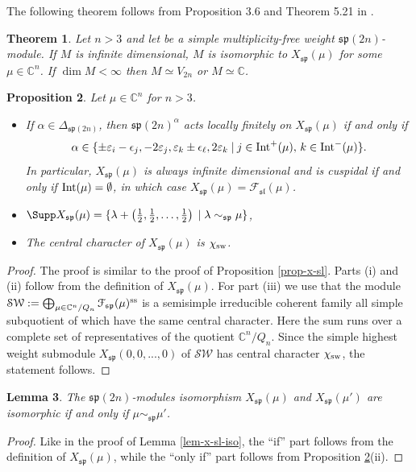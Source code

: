 \documentclass[12pt]{amsart}
\newcommand{\C}{{\mathbb C}}
\newtheorem{thm}{Theorem}[section]
\newtheorem{lem}[thm]{Lemma}
\newtheorem{prop}[thm]{Proposition}
\begin{document}
The following theorem follows from Proposition 3.6 and Theorem 5.21 in \cite{BBL}.
\begin{thm} \label{thm-x-sp-fin}Let $n>3$ and let  be  a simple multiplicity-free  weight $\mathfrak{sp}({2n})$-module. If $M$ is infinite dimensional, $M$  is isomorphic  to $X_{\mathfrak{sp}}(\mu)$ for some $\mu \in \C^{n}$. If $\dim M < \infty$ then  $M \simeq V_{2n}$ or $M \simeq \mathbb C$.
\end{thm}

\begin{prop} \label{thm-bounded-finite-sp}
Let $\mu \in \C^{n}$ for  $n>3$.
\begin{itemize} 
\item[(i)] If $\alpha \in \Delta_{\mathfrak{sp} (2n)}$, then $\mathfrak{sp}(2n)^{\alpha}$ acts locally finitely on $X_{\mathfrak{sp}}(\mu)$ if and only if 
$$\alpha \in \{\pm \varepsilon_i - \epsilon_j, - 2 \varepsilon_j,  \varepsilon_k \pm  \epsilon_\ell, 2 \varepsilon_k  \; | \: j  \in  {\rm Int}^+ (\mu), \, k  \in  {\rm Int}^- (\mu)\}.
$$
In particular, $X_{\mathfrak{sp}}(\mu)$ is always infinite dimensional and is cuspidal if and only if $ {\rm Int} (\mu) = \emptyset$,  in which case $X_{\mathfrak{sp}}(\mu) = {\mathcal F}_{\mathfrak{sl}} (\mu)$.
\item[(ii)] $\Supp X_{\mathfrak{sp}}(\mu) = \{ \lambda + \left(\frac{1}{2}, \frac{1}{2},\dots, \frac{1}{2}\right) \; | \; \lambda\sim_{\mathfrak{sp}} \mu \} $,
\item[(iii)] The central character of $X_{\mathfrak{sp}}(\mu) $ is $\chi_{\rm sw}$.
\end{itemize}
\end{prop}
\begin{proof} The proof is similar to the proof of Proposition \ref{prop-x-sl}. Parts (i) and  (ii) follow from the definition of $X_{\mathfrak{sp}}(\mu)$. For part (iii) we use that the module $\mathcal{SW}  := \bigoplus_{\mu \in \C^n/Q_n}{\mathcal F}_{\mathfrak{sp}} (\mu)^{\rm ss}$ is a semisimple irreducible coherent family all simple subquotient of which have the same central character. Here the sum runs over a complete set of representatives of the quotient $ \C^n/Q_n$. Since the simple highest weight submodule $X_{\mathfrak{sp}}(0, 0,...,0)$ of $\mathcal{SW}$ has central character  $\chi_{\rm sw}$, the statement follows. \end{proof}

\begin{lem}
The $\mathfrak{sp}({2n})$-modules isomorphism $X_{\mathfrak{sp}}(\mu)$ and $ X_{\mathfrak{sp}}(\mu')$ are isomorphic if and only if $\mu \sim_{\mathfrak{sp}} \mu'$.
\end{lem}
\begin{proof} Like in the proof of Lemma \ref{lem-x-sl-iso}, the ``if'' part follows from the definition of $X_{\mathfrak{sp}}(\mu)$, while the ``only if'' part follows from Proposition \ref{thm-bounded-finite-sp}(ii). \end{proof}
\end{document}
